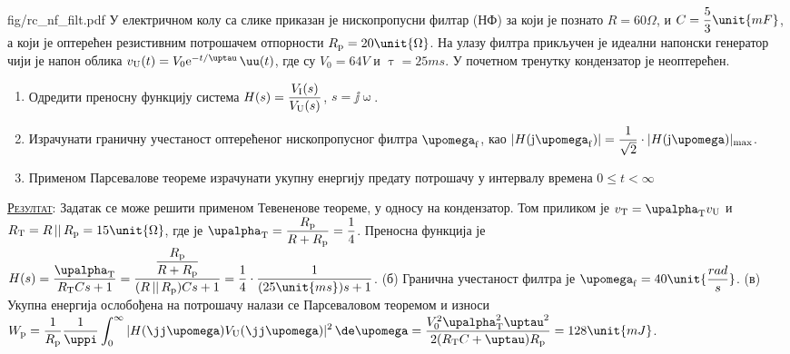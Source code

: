 \mnDifficult
\begin{slikaDesno}[0.833]{fig/rc_nf_filt.pdf}
\PID 
У електричном колу са слике 
приказан је нископропусни филтар
(НФ)
за који је познато
$R = {60}\unit{\Omega}$,  и 
${C = \dfrac{5}{3}\unit{mF}}
\vspace*{1mm}
$, а 
који је оптерећен резистивним потрошачем
отпорности
$R_{\rm p} = 20\unit{\Omega}
\vspace*{1mm}$. На улазу филтра прикључен 
је идеални напонски генератор чији 
је напон облика 
${v_{\rm U}(t) = V_0 
{\rm e}^{-t/\uptau}\,\uu(t)}$, где су
$V_0 = 64\unit{V}$ и 
$\uptau = 25\unit{ms}$. У почетном тренутку
кондензатор је неоптерећен.
\end{slikaDesno}

\begin{enumerate}[label=(\alph*)]
    \item Одредити преносну функцију система 
    $H(s) = \dfrac{V_{\rm I}(s)}{V_{\rm U}(s)}$, $s = \jj\upomega$.
    \item  
    Израчунати граничну учестаност 
    оптерећеног нископропусног
    филтра  $\upomega_{\rm f}$, као 
    $|H({\rm j}\upomega_{\rm f})| = \dfrac{1}{\sqrt 2} 
    \cdot |H({\rm j}\upomega)|_{\rm max}$.
    \item
    Применом Парсевалове теореме израчунати
    укупну енергију предату потрошачу 
    у интервалу времена $0 \leq t < \infty$
\end{enumerate} 

\textsc{\underline{Резултат}:} 
Задатак се може решити применом Тевененове теореме, у односу
на кондензатор. 
Том приликом је $v_{\rm T} = \upalpha_{\rm T} v_{\rm U}$ и
$R_{\rm T} = R\,||\,R_{\rm p} 
= 15\unit{\Omega}$, где је 
$\upalpha_{\rm T} = \dfrac{R_{\rm p}}{R + R_{\rm p}}
= \dfrac{1}{4}$. Преносна функција је 
$H(s) = \dfrac{\upalpha_{\rm T}}{
R_{\rm T}Cs + 1} =  
\dfrac{ \dfrac{R_{\rm p}}{R + R_{\rm p}} }{
(R\,||\,R_{\rm p})Cs + 1
} =
\dfrac{1}{4} \cdot
\dfrac{1}{  (25\unit{ms}) s + 1  }$. 
(б) Гранична учестаност филтра је 
$\upomega_{\rm f} = 40\unit{\dfrac{rad}{s}}$.
(в) Укупна енергија ослобођена на потрошачу 
налази се Парсеваловом теоремом и износи
$\displaystyle
W_{\rm p} = 
\dfrac{1}{R_{\rm p}}
\dfrac{1}{\uppi} 
\int_0^{\infty}
|H(\jj\upomega)V_{\rm U}(\jj\upomega)|^2\,
\de\upomega = 
\dfrac{V_0^2 \upalpha_{\rm T}^2 \uptau^2}{
2(R_{\rm T}C + \uptau)R_{\rm p}} = 
128\unit{mJ}
$.
